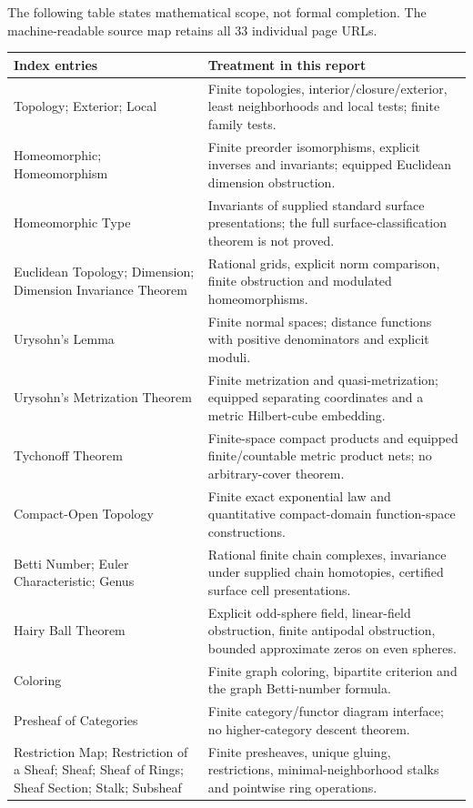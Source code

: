 The following table states mathematical scope, not formal completion. The machine-readable source map retains all 33 individual page URLs.
\begin{longtable}{P{.28\textwidth}P{.64\textwidth}}
\toprule
Index entries & Treatment in this report\\
\midrule
\endhead
Topology; Exterior; Local &
Finite topologies, interior/closure/exterior, least neighborhoods and local tests; finite family tests.\\
Homeomorphic; Homeomorphism &
Finite preorder isomorphisms, explicit inverses and invariants; equipped Euclidean dimension obstruction.\\
Homeomorphic Type &
Invariants of supplied standard surface presentations; the full surface-classification theorem is not proved.\\
Euclidean Topology; Dimension; Dimension Invariance Theorem &
Rational grids, explicit norm comparison, finite obstruction and modulated homeomorphisms.\\
Urysohn's Lemma &
Finite normal spaces; distance functions with positive denominators and explicit moduli.\\
Urysohn's Metrization Theorem &
Finite metrization and quasi-metrization; equipped separating coordinates and a metric Hilbert-cube embedding.\\
Tychonoff Theorem &
Finite-space compact products and equipped finite/countable metric product nets; no arbitrary-cover theorem.\\
Compact-Open Topology &
Finite exact exponential law and quantitative compact-domain function-space constructions.\\
Betti Number; Euler Characteristic; Genus &
Rational finite chain complexes, invariance under supplied chain homotopies, certified surface cell presentations.\\
Hairy Ball Theorem &
Explicit odd-sphere field, linear-field obstruction, finite antipodal obstruction, bounded approximate zeros on even spheres.\\
Coloring &
Finite graph coloring, bipartite criterion and the graph Betti-number formula.\\
Presheaf of Categories &
Finite category/functor diagram interface; no higher-category descent theorem.\\
Restriction Map; Restriction of a Sheaf; Sheaf; Sheaf of Rings; Sheaf Section; Stalk; Subsheaf &
Finite presheaves, unique gluing, restrictions, minimal-neighborhood stalks and pointwise ring operations.\\

\end{longtable}

